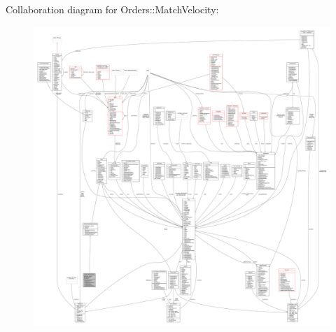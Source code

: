 Collaboration diagram for Orders\+:\+:Match\+Velocity\+:
\nopagebreak
\begin{figure}[H]
\begin{center}
\leavevmode
\includegraphics[width=350pt]{db/dfd/classOrders_1_1MatchVelocity__coll__graph}
\end{center}
\end{figure}
